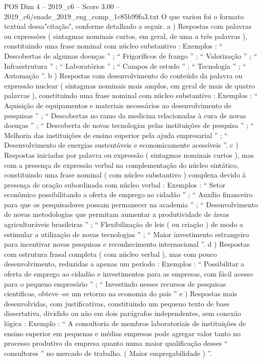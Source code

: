 \begin{textsample}{POS Dim 4 – 2019\_c6 – Score 3.00 – 2019\_c6/enade\_2019\_eng\_comp\_1c85b99fa3.txt}
O que variou foi o formato textual dessa"citação", conforme detalhado a seguir. a ) Respostas com palavras ou expressões ( sintagmas nominais curtos, em geral, de uma a três palavras ), constituindo uma frase nominal com núcleo substantivo : Exemplos : “ Descobertas de algumas doenças ” ; “ Frigoríficos de frango ” ; “ Valorização ” ; “ Infraestrutura ” ; “ Laboratórios ” ; “ Campos de estudo ” ; “ Tecnologia ” ; “ Automação ”. b ) Respostas com desenvolvimento do conteúdo da palavra ou expressão nuclear ( sintagmas nominais mais amplos, em geral de mais de quatro palavras ), constituindo uma frase nominal com núcleo substantivo : Exemplos : “ Aquisição de equipamentos e materiais necessários ao desenvolvimento de pesquisas ” ; “ Descobertas no ramo da medicina relacionadas à cura de novas doenças ” ; “ Descoberta de novas tecnologias pelas instituições de pesquisa ” ; “ Melhoria das instituições de ensino superior pela ajuda empresarial ” ; “ Desenvolvimento de energias sustentáveis e economicamente acessíveis ”. c ) Respostas iniciadas por palavra ou expressão ( sintagmas nominais curtos ), mas com a presença de expressão verbal na complementação do núcleo sintático, constituindo uma frase nominal ( com núcleo substantivo ) complexa devido à presença de oração subordinada com núcleo verbal : Exemplos : “ Setor econômico possibilitando a oferta de emprego ao cidadão ” ; “ Auxílio financeiro para que os pesquisadores possam permanecer na academia ” ; “ Desenvolvimento de novas metodologias que permitam aumentar a produtividade de áreas agriculturáveis brasileiras ” ; “ Flexibilização de leis ( ou criação ) de modo a estimular a utilização de novas tecnologias ” ; “ Maior investimento estrangeiro para incentivar novas pesquisas e reconhecimento internacional ”. d ) Respostas com estrutura frasal completa ( com núcleo verbal ), mas com pouco desenvolvimento, reduzidas a apenas um período : Exemplos : “ Possibilitar a oferta de emprego ao cidadão e investimentos para as empresas, com fácil acesso para o pequeno empresário ” ; “ Investindo nesses recursos de pesquisas cientificas, obteve -se um retorno na economia do país ” e ) Respostas mais desenvolvidas, com justificativas, constituindo um pequeno texto de base dissertativa, dividido ou não em dois parágrafos independentes, sem conexão lógica : Exemplo : “ A consultoria de membros laboratoriais de instituições de ensino superior em pequenas e médias empresas pode agregar valor tanto no processo produtivo da empresa quanto numa maior qualificação desses “ consultores ” no mercado de trabalho. ( Maior empregabilidade ) ”.

\end{textsample}
